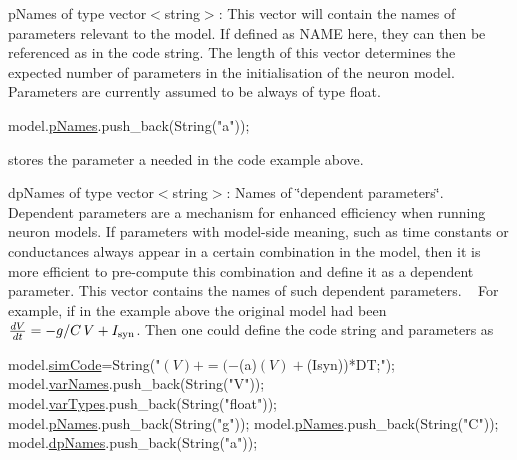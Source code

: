 \begin{DoxyItemize}
\item {\ttfamily p\+Names} of type {\ttfamily vector$<$string$>$}\+: This vector will contain the names of parameters relevant to the model. If defined as {\ttfamily N\+A\+M\+E} here, they can then be referenced as {\ttfamily } in the code string. The length of this vector determines the expected number of parameters in the initialisation of the neuron model. Parameters are currently assumed to be always of type float. ~\newline
 
\begin{DoxyCode}
model.\hyperlink{structneuronModel_a4a5bf1f757a72b6edc28ad26ed61b2be}{pNames}.push\_back(String(\textcolor{stringliteral}{"a"}));
\end{DoxyCode}
 stores the parameter {\ttfamily a} needed in the code example above.
\item {\ttfamily dp\+Names} of type {\ttfamily vector$<$string$>$}\+: Names of \char`\"{}dependent
  parameters\char`\"{}. Dependent parameters are a mechanism for enhanced efficiency when running neuron models. If parameters with model-\/side meaning, such as time constants or conductances always appear in a certain combination in the model, then it is more efficient to pre-\/compute this combination and define it as a dependent parameter. This vector contains the names of such dependent parameters. ~\newline
 For example, if in the example above the original model had been $\frac{dV}{dt} = -g/C \, V +I_{\rm syn}$. Then one could define the code string and parameters as 
\begin{DoxyCode}
model.\hyperlink{structneuronModel_a9e6536fd15b69fa24b708e41f97df899}{simCode}=String(\textcolor{stringliteral}{"$(V)+= (-$(a)$(V)+$(Isyn))*DT;"});
model.\hyperlink{structneuronModel_a9a9156ffb643572fd67f6e585ef79ad0}{varNames}.push\_back(String(\textcolor{stringliteral}{"V"}));
model.\hyperlink{structneuronModel_a86788cb29131da0a26ce79693a076352}{varTypes}.push\_back(String(\textcolor{stringliteral}{"float"}));
model.\hyperlink{structneuronModel_a4a5bf1f757a72b6edc28ad26ed61b2be}{pNames}.push\_back(String(\textcolor{stringliteral}{"g"}));
model.\hyperlink{structneuronModel_a4a5bf1f757a72b6edc28ad26ed61b2be}{pNames}.push\_back(String(\textcolor{stringliteral}{"C"}));
model.\hyperlink{structneuronModel_a051c0c704ce383c43cdf446accbeb201}{dpNames}.push\_back(String(\textcolor{stringliteral}{"a"}));
\end{DoxyCode}


\end{DoxyItemize}
